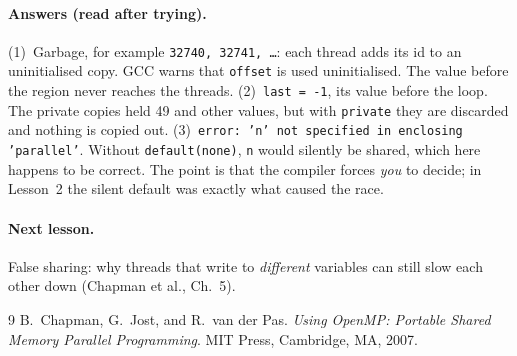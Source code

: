 \documentclass[11pt,a4paper]{article}
\begin{document}
\paragraph{Answers (read after trying).}
(1)~Garbage, for example \texttt{32740, 32741, \ldots}: each thread adds its id to an
uninitialised copy. GCC warns that \texttt{offset} is used uninitialised. The value
before the region never reaches the threads.
(2)~\texttt{last = -1}, its value before the loop. The private copies held 49 and other
values, but with \texttt{private} they are discarded and nothing is copied out.
(3)~\texttt{error: 'n' not specified in enclosing 'parallel'}. Without
\texttt{default(none)}, \texttt{n} would silently be shared, which here happens to be
correct. The point is that the compiler forces \emph{you} to decide; in Lesson~2 the
silent default was exactly what caused the race.

\paragraph{Next lesson.} False sharing: why threads that write to \emph{different}
variables can still slow each other down (Chapman et al., Ch.~5).

\begin{thebibliography}{9}
 B.~Chapman, G.~Jost, and R.~van der Pas. \emph{Using OpenMP: Portable
  Shared Memory Parallel Programming}. MIT Press, Cambridge, MA, 2007.
\end{thebibliography}
\end{document}
